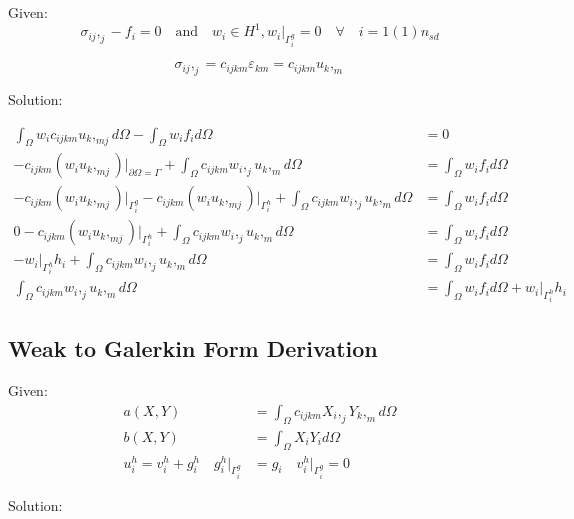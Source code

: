 \documentclass[a4paper, 12pt]{article}
\begin{document}
Given:
\begin{equation*}
\sigma_{ij},_{j} - f_{i} = 0 \quad \text{and} \quad
w_{i} \in H^1, w_{i}\Big|_{\Gamma^{g}_{i}} = 0
    \quad \forall \quad i=1(1)n_{sd}
\end{equation*}

\begin{equation*}
\sigma_{ij},_{j} = c_{ijkm} \varepsilon_{km} = c_{ijkm} u_{k},_{m}
\end{equation*}

\noindent
Solution:

\begin{align*}
\int_{\Omega} w_{i} c_{ijkm} u_{k},_{mj} d\Omega -
  \int_{\Omega} w_{i} f_{i} d\Omega &= 0 \\
-c_{ijkm}(w_{i} u_{k},_{mj})\Big|_{\partial\Omega = \Gamma}
  + \int_{\Omega} c_{ijkm} w_{i},_{j} u_{k},_{m} d\Omega
  &=\int_{\Omega} w_{i} f_{i} d\Omega  \\
-c_{ijkm}(w_{i} u_{k},_{mj})\Big|_{\Gamma^{g}_{i}}
-c_{ijkm}(w_{i} u_{k},_{mj})\Big|_{\Gamma^{h}_{i}}
  + \int_{\Omega} c_{ijkm} w_{i},_{j} u_{k},_{m} d\Omega
  &=\int_{\Omega} w_{i} f_{i} d\Omega \\
0
 -c_{ijkm}(w_{i} u_{k},_{mj})\Big|_{\Gamma^{h}_{i}}
  + \int_{\Omega} c_{ijkm} w_{i},_{j} u_{k},_{m} d\Omega
  &=\int_{\Omega} w_{i} f_{i} d\Omega \\
-w_{i}\Big|_{\Gamma^{h}_{i}} h_{i}
  + \int_{\Omega} c_{ijkm} w_{i},_{j} u_{k},_{m} d\Omega
  &=\int_{\Omega} w_{i} f_{i} d\Omega \\
\int_{\Omega} c_{ijkm} w_{i},_{j} u_{k},_{m} d\Omega &=
  \int_{\Omega} w_{i} f_{i} d\Omega +
  w_{i}\Big|_{\Gamma^{h}_{i}} h_{i}
\end{align*}

\newpage
\subsection{Weak to Galerkin Form Derivation} \label{sec:GalerkinDer}

Given:
\begin{align*}
a( X, Y ) &=
  \int_{\Omega} c_{ijkm} X_{i},_{j} Y_{k},_{m} d\Omega \\
b( X, Y ) &=
  \int_{\Omega} X_{i} Y_{i} d\Omega \\
u^{h}_{i} =
  v^{h}_{i} + g^{h}_{i}
  \quad
  g^{h}_{i}\Big|_{\Gamma^{g}_{i}} &= g_{i}
  \quad
  v^{h}_{i}\Big|_{\Gamma^{g}_{i}} = 0
\end{align*}

\noindent
Solution:
\end{document}
